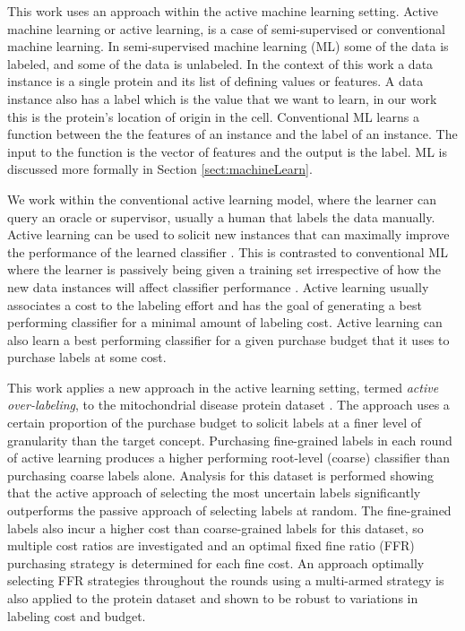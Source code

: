 \documentclass[ms]{nuthesis}
\begin{document}
\par This work uses an approach within the active machine learning setting.
Active machine learning or active learning, is a case
of semi-supervised or conventional machine learning. In semi-supervised machine learning (ML)
some of the data is labeled, and some of the data is unlabeled. In the context of this work
a data instance is a single protein and its list of defining values or features. A data
instance also has a label which is the value that we want to learn, in our work this is the
 protein's location of origin in the cell. Conventional ML learns a function between the
 the features of an instance and the label of an instance. The input to the function is the vector
 of features and the output is the label. ML is discussed more
 formally in Section \ref{sect:machineLearn}.

 \par We work within
the conventional active learning model, where the learner can query an oracle or supervisor,
usually a human that labels the data manually. Active learning can be used to solicit new
instances that can maximally
improve the performance of the learned classifier \cite{mitchell}. This is contrasted to
conventional ML where the learner is passively being given a training set irrespective of
how the new data instances will affect classifier performance \cite{mitchell}. Active learning
usually associates a cost to the labeling effort and has the goal of generating
a best performing classifier for a minimal amount of labeling cost. Active learning
can also learn a best performing classifier for a given purchase budget that it uses to
purchase labels at some cost.

\par This work applies a new approach in the
active learning setting, termed \textit{active over-labeling}, to the mitochondrial
disease protein dataset \cite{yugi}.
The approach uses a certain proportion of the purchase budget to solicit
labels at a finer level of granularity than the target concept.
Purchasing fine-grained labels in each round of active learning produces a
higher performing root-level (coarse) classifier than purchasing coarse
labels alone. Analysis for this dataset is performed showing that
 the active approach of selecting the most uncertain labels significantly
 outperforms the passive approach of selecting labels at random.
The fine-grained labels also incur a higher cost than coarse-grained
labels for this dataset, so multiple cost ratios are investigated and an optimal fixed fine
ratio (FFR)
purchasing strategy is determined for each fine cost. An approach optimally selecting
 FFR strategies throughout the rounds using a multi-armed strategy is also applied to the protein dataset
 and shown to be robust to variations in labeling cost and budget.
\end{document}
